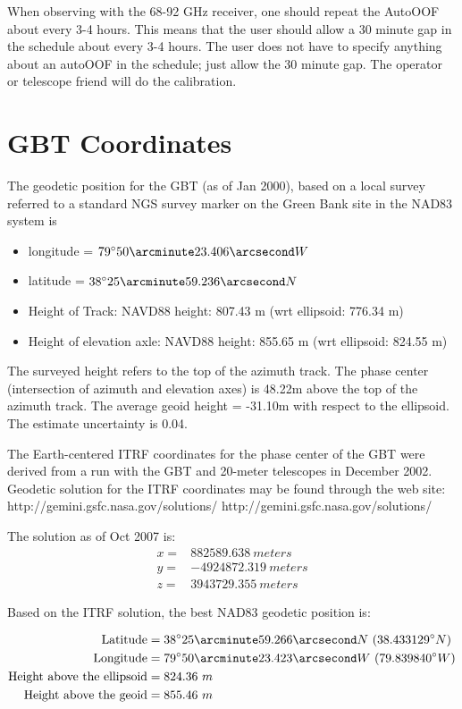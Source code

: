 When observing with the 68-92 GHz receiver, one should repeat the AutoOOF
about every 3-4 hours. This means that the user should allow a 30 minute gap
in the schedule about every 3-4 hours. The user does not have to specify
anything about an autoOOF in the schedule; just allow the 30 minute gap.
The operator or telescope friend will do the calibration. 

\section{GBT Coordinates}

The geodetic position for the GBT (as of Jan 2000), based on a local survey
referred to a standard NGS survey marker on the Green Bank site in the NAD83
system is
\begin{itemize}
\item longitude = $79^{\circ} 50\arcminute 23.406\arcsecond W$
\item latitude = $38^{\circ} 25\arcminute 59.236\arcsecond N$
\item Height of Track: NAVD88 height: 807.43 m (wrt ellipsoid: 776.34 m)
\item Height of elevation axle: NAVD88 height: 855.65 m (wrt ellipsoid: 824.55 m) 
\end{itemize}

The surveyed height refers to the top of the azimuth track. The phase center
(intersection of azimuth and elevation axes) is 48.22m above the top of the
azimuth track. The average geoid height = -31.10m with respect to the
ellipsoid. The estimate uncertainty is 0.04\arcsecond.

The Earth-centered \gls{ITRF} coordinates for the phase center of the \gls{GBT}
were derived from a  run with the \gls{GBT} and 20-meter telescopes in
December 2002.  Geodetic solution for the \gls{ITRF} coordinates may be found
through the web site:\\
\htmladdnormallink
{http://gemini.gsfc.nasa.gov/solutions/}
{http://gemini.gsfc.nasa.gov/solutions/}

\noindent The solution as of Oct 2007 is:
\begin{align*}
x =& 882589.638\ meters \\
y =& -4924872.319\ meters \\
z =& 3943729.355\ meters
\end{align*}

\noindent Based on the \gls{ITRF} solution, the best NAD83 geodetic position is:

\begin{align*}
\text{Latitude} &= 38^{\circ} 25\arcminute 59.266\arcsecond N\ (38.433129^{\circ} N)  \\
\text{Longitude}&= 79^{\circ} 50\arcminute 23.423\arcsecond W\ (79.839840^{\circ} W)  \\ 
\text{Height above the ellipsoid}&= 824.36\ m \\
\text{Height above the geoid}&= 855.46\ m 
\end{align*}